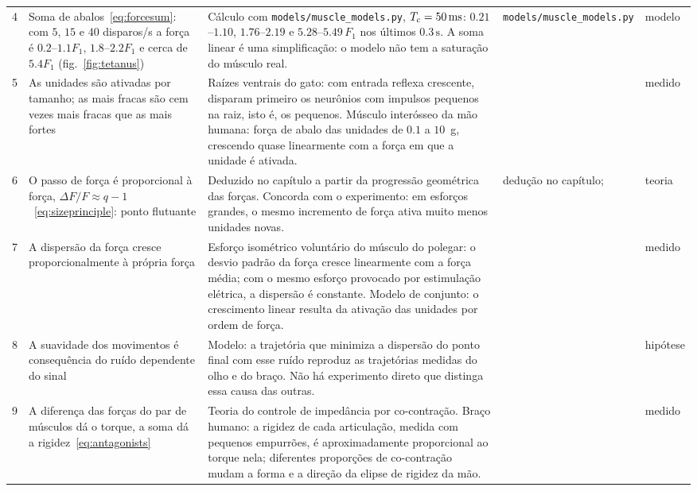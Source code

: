 {\begin{longtable}{>{\raggedright}p{0.5cm}>{\raggedright}p{4.0cm}>{\raggedright}p{5.6cm}>{\raggedright}p{2.3cm}>{\raggedright\arraybackslash}p{1.7cm}}
4 & Soma de abalos~\eqref{eq:forcesum}: com $5$, $15$ e $40$ disparos/s a força é $0.2$--$1.1F_1$, $1.8$--$2.2F_1$ e cerca de $5.4F_1$ (fig.~\ref{fig:tetanus}) & Cálculo com \texttt{models/\allowbreak muscle\_\allowbreak models.py}, $T_c=50\,\text{ms}$: $0.21$--$1.10$, $1.76$--$2.19$ e $5.28$--$5.49\,F_1$ nos últimos $0.3\,\text{s}$. A soma linear é uma simplificação: o modelo não tem a saturação do músculo real. & \texttt{models/\allowbreak muscle\_\allowbreak models.py} & modelo \\
5 & As unidades são ativadas por tamanho; as mais fracas são cem vezes mais fracas que as mais fortes & Raízes ventrais do gato: com entrada reflexa crescente, disparam primeiro os neurônios com impulsos pequenos na raiz, isto é, os pequenos. Músculo interósseo da mão humana: força de abalo das unidades de $0.1$ a $10$~g, crescendo quase linearmente com a força em que a unidade é ativada. & \cite{Henneman1957, MilnerBrown1973rec} & medido \\
6 & O passo de força é proporcional à força, $\Delta F/F\approx q-1$~\eqref{eq:sizeprinciple}: ponto flutuante & Deduzido no capítulo a partir da progressão geométrica das forças. Concorda com o experimento: em esforços grandes, o mesmo incremento de força ativa muito menos unidades novas. & dedução no capítulo; \cite{MilnerBrown1973rec} & teoria \\
7 & A dispersão da força cresce proporcionalmente à própria força & Esforço isométrico voluntário do músculo do polegar: o desvio padrão da força cresce linearmente com a força média; com o mesmo esforço provocado por estimulação elétrica, a dispersão é constante. Modelo de conjunto: o crescimento linear resulta da ativação das unidades por ordem de força. & \cite{Jones2002sdn} & medido \\
8 & A suavidade dos movimentos é consequência do ruído dependente do sinal & Modelo: a trajetória que minimiza a dispersão do ponto final com esse ruído reproduz as trajetórias medidas do olho e do braço. Não há experimento direto que distinga essa causa das outras. & \cite{HarrisWolpert1998} & hipótese \\
9 & A diferença das forças do par de músculos dá o torque, a soma dá a rigidez~\eqref{eq:antagonists} & Teoria do controle de impedância por co-contração. Braço humano: a rigidez de cada articulação, medida com pequenos empurrões, é aproximadamente proporcional ao torque nela; diferentes proporções de co-contração mudam a forma e a direção da elipse de rigidez da mão. & \cite{Hogan1984, GomiOsu1998stiff} & medido \\

\end{longtable}}
